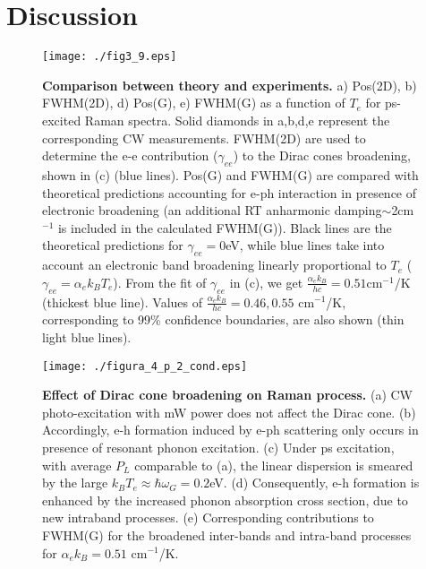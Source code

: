 \documentclass[aps, prl,twocolumn]{revtex4}
\begin{document}
\section*{Discussion}

\begin{figure}
	\centerline{\texttt{[image: ./fig3\_9.eps]}}
	\caption{\textbf{Comparison between theory and experiments.} a) Pos(2D), b) FWHM(2D), d) Pos(G), e) FWHM(G) as a function of $T_e$ for ps-excited Raman spectra. Solid diamonds in a,b,d,e represent the corresponding CW measurements. FWHM(2D) are used to determine the e-e contribution ($\gamma_{ee}$) to the Dirac cones broadening, shown in (c) (blue lines). Pos(G) and FWHM(G) are compared with theoretical predictions accounting for e-ph interaction in presence of electronic broadening (an additional RT anharmonic damping$\sim$2cm$^{-1}$\cite{Bonini2007} is included in the calculated FWHM(G)). Black lines are the theoretical predictions for $\gamma_{ee}=0$eV, while blue lines take into account an electronic band broadening linearly proportional to $T_e$ ($\gamma_{ee}=\alpha_e k_B T_e$). From the fit of $\gamma_{ee}$ in (c), we get $\frac{\alpha_e k_B}{hc}=0.51$cm$^{-1}$/K (thickest blue line). Values of $\frac{\alpha_e k_B}{hc}=0.46, 0.55$ cm$^{-1}$/K, corresponding to 99\% confidence boundaries, are also shown (thin light blue lines).}
	\label{fig3}
\end{figure}


\begin{figure*}
	\centerline{\texttt{[image: ./figura\_4\_p\_2\_cond.eps]}}
	\caption{\textbf{Effect of Dirac cone broadening on Raman process.} (a) CW photo-excitation with mW power does not affect the Dirac cone. (b) Accordingly, e-h formation induced by e-ph scattering only occurs in presence of resonant phonon excitation. (c) Under ps excitation, with average $P_L$ comparable to (a), the linear dispersion is smeared by the large $k_B T_e \approx \hbar \omega_G = 0.2$eV.  (d) Consequently, e-h formation is enhanced by the increased phonon absorption cross section, due to new intraband processes. (e) Corresponding contributions to FWHM(G) for the broadened inter-bands and intra-band processes for $\alpha_e k_B=0.51$ cm$^{-1}$/K.}
	\label{fig4}
\end{figure*}
\end{document}
